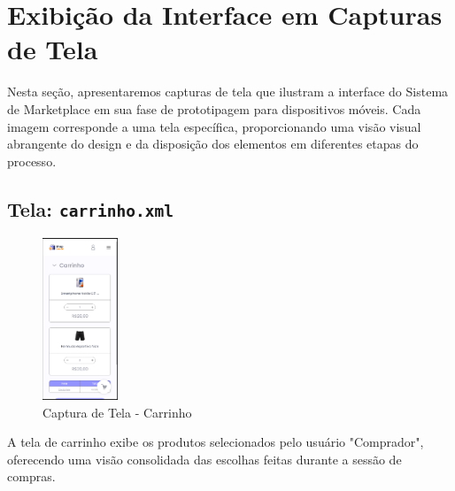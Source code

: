 \documentclass[
	12pt,				%
	openright,			%
	twoside,			%
	a4paper,			%
	english,			%
	brazil				%
	]{abntex2}
\begin{document}
\section{Exibição da Interface em Capturas de Tela}

Nesta seção, apresentaremos capturas de tela que ilustram a interface do Sistema de Marketplace em sua fase de prototipagem para dispositivos móveis. Cada imagem corresponde a uma tela específica, proporcionando uma visão visual abrangente do design e da disposição dos elementos em diferentes etapas do processo.

\subsection{Tela: \texttt{carrinho.xml}}

\begin{figure}[htb]
    \centering
    \includegraphics[width=0.2\textwidth]{img/carrinho}
    \caption{Captura de Tela - Carrinho}
\end{figure}

A tela de carrinho exibe os produtos selecionados pelo usuário "Comprador", oferecendo uma visão consolidada das escolhas feitas durante a sessão de compras.
\end{document}

